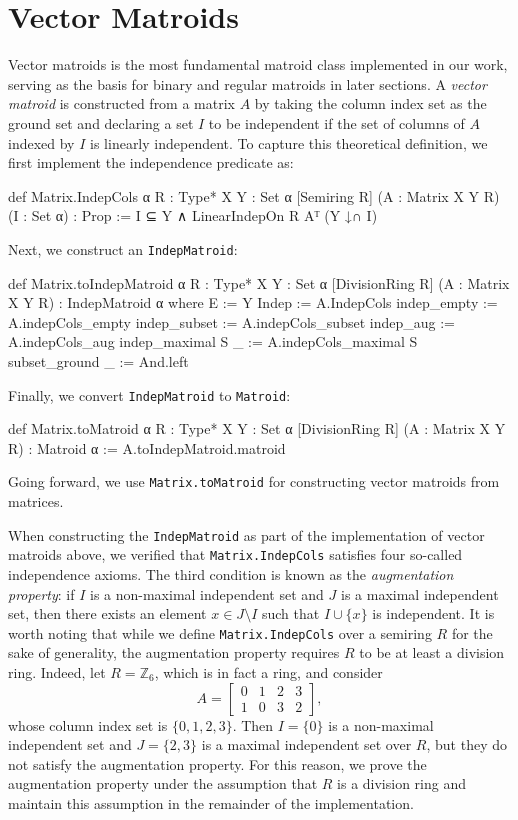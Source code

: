 \section{Vector Matroids}

Vector matroids \cite{Oxley2011,Truemper2016} is the most fundamental matroid class implemented in our work, serving as the basis for binary and regular matroids in later sections. A \emph{vector matroid} is constructed from a matrix $A$ by taking the column index set as the ground set and declaring a set $I$ to be independent if the set of columns of $A$ indexed by $I$ is linearly independent. To capture this theoretical definition, we first implement the independence predicate as:
\begin{leancode}
def Matrix.IndepCols {α R : Type*} {X Y : Set α}
    [Semiring R] (A : Matrix X Y R) (I : Set α) :
    Prop :=
  I ⊆ Y ∧ LinearIndepOn R Aᵀ (Y ↓∩ I)
\end{leancode}
Next, we construct an \texttt{IndepMatroid}:
\begin{leancode}
def Matrix.toIndepMatroid {α R : Type*} {X Y : Set α}
    [DivisionRing R] (A : Matrix X Y R) :
    IndepMatroid α where
  E := Y
  Indep := A.IndepCols
  indep_empty := A.indepCols_empty
  indep_subset := A.indepCols_subset
  indep_aug := A.indepCols_aug
  indep_maximal S _ := A.indepCols_maximal S
  subset_ground _ := And.left
\end{leancode}
Finally, we convert \texttt{IndepMatroid} to \texttt{Matroid}:
\begin{leancode}
def Matrix.toMatroid {α R : Type*} {X Y : Set α}
    [DivisionRing R] (A : Matrix X Y R) :
    Matroid α :=
  A.toIndepMatroid.matroid
\end{leancode}
Going forward, we use \texttt{Matrix.toMatroid} for constructing vector matroids from matrices.

When constructing the \texttt{IndepMatroid} as part of the implementation of vector matroids above, we verified that \texttt{Matrix.IndepCols} satisfies four so-called independence axioms. The third condition is known as the \emph{augmentation property}: if $I$ is a non-maximal independent set and $J$ is a maximal independent set, then there exists an element $x \in J \setminus I$ such that $I \cup \{x\}$ is independent. It is worth noting that while we define \texttt{Matrix.IndepCols} over a semiring $R$ for the sake of generality, the augmentation property requires $R$ to be at least a division ring. Indeed, let $R = \mathbb{Z}_{6}$, which is in fact a ring, and consider
\[
    A = \begin{bmatrix}
       0 & 1 & 2 & 3 \\
       1 & 0 & 3 & 2
    \end{bmatrix},
\]
whose column index set is $\{0, 1, 2, 3\}$. Then $I = \{0\}$ is a non-maximal independent set and $J = \{2, 3\}$ is a maximal independent set over $R$, but they do not satisfy the augmentation property. For this reason, we prove the augmentation property under the assumption that $R$ is a division ring and maintain this assumption in the remainder of the implementation.

